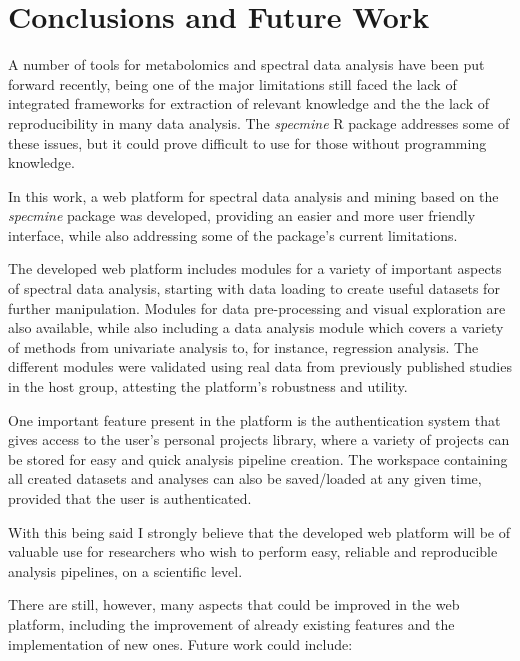 
\chapter{Conclusions and Future Work}

A number of tools for metabolomics and spectral data analysis have been put forward recently, being one of the major limitations still faced the lack of integrated frameworks for extraction of relevant knowledge and the the lack of reproducibility in many data analysis. The \textit{specmine} R package addresses some of these issues, but it could prove difficult to use for those without programming knowledge. 

In this work, a web platform for spectral data analysis and mining based on the \textit{specmine} package was developed, providing an easier and more user friendly interface, while also addressing some of the package's current limitations.

The developed web platform includes modules for a variety of important
aspects of spectral data analysis, starting with data loading to create useful datasets for further manipulation. Modules for data pre-processing and visual exploration are also available, while also including a data analysis module which covers a variety of methods from univariate analysis to, for instance, regression analysis. The different modules were validated using real data from previously published studies in the host group, attesting the platform's robustness and utility.

One important feature present in the platform is the authentication system that gives access to the user's personal projects library, where a variety of projects can be stored for easy and quick analysis pipeline creation. The workspace containing all created datasets and analyses can also be saved/loaded at any given time, provided that the user is authenticated.

With this being said I strongly believe that the developed web platform will be of valuable use for researchers who wish to perform easy, reliable and reproducible analysis pipelines, on a scientific level.

There are still, however, many aspects that could be improved in the web platform, including the improvement of already existing features and the implementation of new ones. Future work could include:


